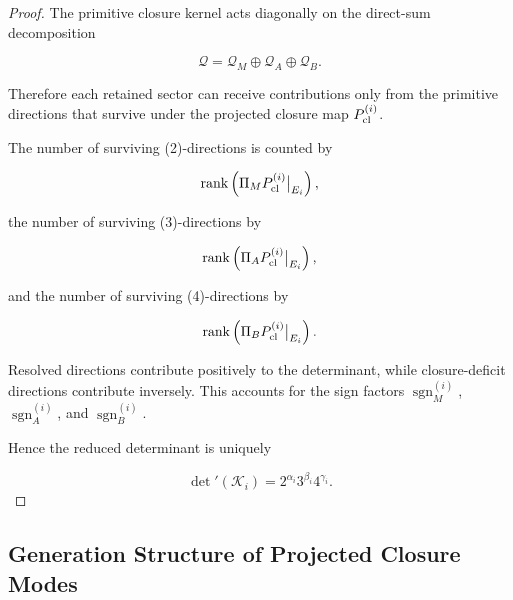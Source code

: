 \documentclass[11pt]{article}
\theoremstyle{definition}
\theoremstyle{remark}
\begin{document}
\begin{proof}

The primitive closure kernel acts diagonally on the direct-sum
decomposition

\begin{equation}
\mathcal Q = 
\mathcal Q_M
\oplus
\mathcal Q_A
\oplus
\mathcal Q_B.
\end{equation}

Therefore each retained sector can receive contributions only
from the primitive directions that survive under the projected
closure map \(P_{\rm cl}^{(i)}\).

The number of surviving (2)-directions is counted by

\begin{equation}
\operatorname{rank}
\left(
\Pi_M P_{\rm cl}^{(i)}
\big|_{E_i}
\right),
\end{equation}

the number of surviving (3)-directions by

\begin{equation}
\operatorname{rank}
\left(
\Pi_A P_{\rm cl}^{(i)}
\big|_{E_i}
\right),
\end{equation}

and the number of surviving (4)-directions by

\begin{equation}
\operatorname{rank}
\left(
\Pi_B P_{\rm cl}^{(i)}
\big|_{E_i}
\right).
\end{equation}

Resolved directions contribute positively to the determinant,
while closure-deficit directions contribute inversely. This
accounts for the sign factors
\(\operatorname{sgn}_M^{(i)}\),
\(\operatorname{sgn}_A^{(i)}\), and
\(\operatorname{sgn}_B^{(i)}\).

Hence the reduced determinant is uniquely

\begin{equation}
\det{}'(\mathcal K_i) =
2^{\alpha_i}
3^{\beta_i}
4^{\gamma_i}.
\end{equation}

\end{proof}


\subsection{Generation Structure of Projected Closure Modes}
\label{subsec:generation_structure}
\end{document}
